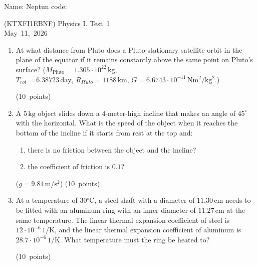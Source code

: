 \documentclass[12pt]{letter}
\begin{document}
Name: \hrulefill \quad Neptun code: \hrulefill

\begin{center}
(KTXFI1EBNF) Physics I. Test~1 \\
May~11,~2026 
\end{center}

\bigskip

\begin{enumerate}
\setcounter{enumi}{0}

\item At what distance from Pluto does a Pluto-stationary satellite orbit in the plane of the equator if it remains constantly above the same point on Pluto's surface? ($M_{\mathrm{Pluto}}=1.305\cdot 10^{22}\,\mathrm{kg}$, \\ $T_{rot}=6.38723\,\mathrm{day}$, $R_{Pluto}=1188\,\mathrm{km}$, $G=6.6743\cdot 10^{-11}\,\mathrm{Nm^2/kg^2}$.)  

\hfill (10~points)


\bigskip
\item A $5\,\mathrm{kg}$ object slides down a $4$-meter-high incline that makes an angle of $45^\circ$ with the horizontal. What is the speed of the object when it reaches the bottom of the incline if it starts from rest at the top and:
\begin{enumerate}
    \item there is no friction between the object and the incline?
    \item the coefficient of friction is $0.1$? 
    \end{enumerate}
($g=9.81\,\mathrm{m/s^{2}}$) \hfill (10~points)


\bigskip
\item At a temperature of $30{}^{\circ}\mathrm{C}$, a steel shaft with a diameter of $11.30\,\mathrm{cm}$ needs to be fitted with an aluminum ring with an inner diameter of $11.27\,\mathrm{cm}$ at the same temperature. The linear thermal expansion coefficient of steel is $12 \cdot 10^{-6}\,\mathrm{1/K}$, and the linear thermal expansion coefficient of aluminum is $28.7 \cdot 10^{-6}\,\mathrm{1/K}$. What temperature must the ring be heated to?

\hfill (10~points)


\end{enumerate}
\end{document}

